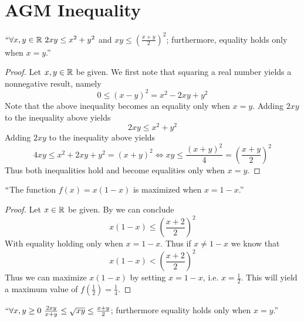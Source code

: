    \section{AGM Inequality}
        \begin{theorem}
            \label{AGM Inequality 1}
            $``\forall x, y \in \mathbb{R} \ 2xy \le x^2 + y^2$ and $xy \le \left(\frac{x + y}{2}\right)^2$;
            furthermore, equality holds only when $x = y$.''
        \end{theorem}
        \begin{proof}
            Let $x, y \in \mathbb{R}$ be given. We first note that squaring a real number
            yields a nonnegative result, namely
            \[
                0 \le (x - y)^2 = x^2 - 2xy + y^2
            \]
            Note that the above inequality becomes an equality only when $x = y$.
            Adding $2xy$ to the inequality above yields
            \begin{equation}
                2xy \le x^2 + y^2
            \end{equation}
            Adding $2xy$ to the inequality above yields
            \begin{equation}
                4xy \le x^2 + 2xy + y^2 = (x + y)^2 \iff xy \le \frac{(x + y)^2}{4}
                                        = \left(\frac{x + y}{2}\right)^2
            \end{equation}
            Thus both inequalities hold and become equalities only when $x = y$. \QED
        \end{proof}
        \begin{corollary}
            $``$The function $f(x) = x(1 - x)$ is maximized when $x = 1 - x$.''
        \end{corollary}
        \begin{proof}
            Let $x \in \mathbb{R}$ be given. By  we can conclude
            \[
                x(1 - x) \le \left(\frac{x + 2}{2}\right)^2
            \]
            With equality holding only when $x = 1 - x$. Thus if $x \neq 1 - x$ we know that
            \[
                x(1 - x) <  \left(\frac{x + 2}{2}\right)^2
            \]
            Thus we can maximize $x(1 - x)$ by setting $x = 1 - x$, i.e. $x = \frac{1}{2}$.
            This will yield a maximum value of $f(\frac{1}{2}) = \frac{1}{4}$. \QED
        \end{proof}
        \begin{theorem}
            $``\forall x, y \ge 0 \ \frac{2xy}{x + y} \le \sqrt{xy} \le \frac{x + y}{2}$;
            furthermore equality holds only when $x = y$.''
        \end{theorem}
